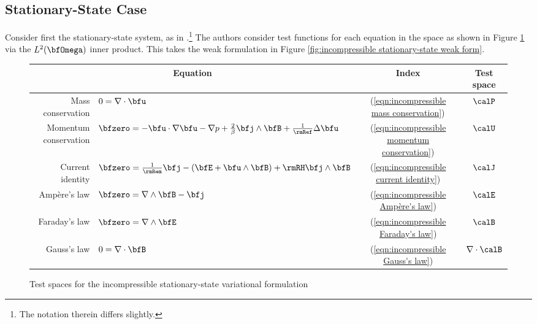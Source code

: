 \subsection*{Stationary-State Case}
    Consider first the stationary-state system, as in \cite{Laakmann_Hu_Farrell_2022}.\footnote{The notation therein differs slightly.} The authors consider test functions for each equation in the space as shown in Figure \ref{fig:incompressible stationary-state test spaces} via the $L^{2}(\bfOmega)$ inner product. This takes the weak formulation in Figure \ref{fig:incompressible stationary-state weak form}.
    
    \begin{figure}
        \centering
        \begin{tabular}{ r l c | c }
            \multicolumn{2}{c}{Equation}  &  Index  &  Test space  \\
            \hline\hline
            Mass conservation  &  $0  =  \nabla\cdot\bfu$  &  (\ref{eqn:incompressible mass conservation})  &  $\calP$  \\
            Momentum conservation  &  $\bfzero 
             =  - \bfu\cdot\nabla\bfu - \nabla p + \frac{2}{\beta}\bfj\wedge\bfB + \frac{1}{\rmRef}\Delta\bfu$  &  (\ref{eqn:incompressible momentum conservation})  &  $\calU$  \\
            \hline
            Current identity  &  $\bfzero  =  \frac{1}{\rmRem}\bfj - (\bfE + \bfu\wedge\bfB) + \rmRH\bfj\wedge\bfB$  &  (\ref{eqn:incompressible current identity})  &  $\calJ$  \\
            \hline
            Ampère's law  &  $\bfzero  =  \nabla\wedge\bfB - \bfj$  &  (\ref{eqn:incompressible Ampère's law})  &  $\calE$  \\
            Faraday's law  &  $\bfzero  =  \nabla\wedge\bfE$  &  (\ref{eqn:incompressible Faraday's law})  &  $\calB$  \\
            Gauss's law  &  $0  =  \nabla\cdot\bfB$  &  (\ref{eqn:incompressible Gauss's law})  &  $\nabla\cdot\calB$  \\
        \end{tabular}
        \caption{Test spaces for the incompressible stationary-state variational formulation}
        \label{fig:incompressible stationary-state test spaces}
    \end{figure}


